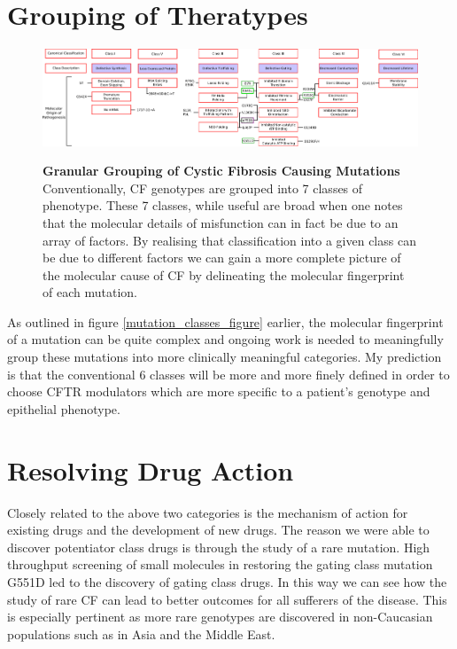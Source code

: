 \section{Grouping of Theratypes}
\begin{landscape}
\begin{figure}
	\begin{center}
	\includegraphics[width=1.5\textwidth]{figures/classes_mutations.pdf}\\
	\end{center}
	\captionsetup{singlelinecheck = false, justification=raggedright}
	\caption[Granular grouping of CF pathogenesis]{\textbf{Granular Grouping of Cystic Fibrosis Causing Mutations}{ Conventionally, CF genotypes are grouped into 7 classes of phenotype. These 7 classes, while useful are broad when one notes that the molecular details of misfunction can in fact be due to an array of factors. By realising that classification into a given class can be due to different factors we can gain a more complete  picture of the molecular cause of CF by delineating the molecular fingerprint of each mutation.}}

\end{figure}
\end{landscape}

As outlined in figure \ref{mutation_classes_figure} earlier, the molecular fingerprint of a mutation can be quite complex and ongoing work is needed to meaningfully group these mutations into more clinically meaningful categories. My prediction is that the conventional 6 classes will be more and more finely defined in order to choose CFTR modulators which are more specific to a patient's genotype and epithelial phenotype. 

\section{Resolving Drug Action}
Closely related to the above two categories is the mechanism of action for existing drugs and the development of new drugs. The reason we were able to discover potentiator class drugs is through the study of a rare mutation. High throughput screening of small molecules in restoring the gating class mutation G551D led to the discovery of gating class drugs. In this way we can see how the study of rare CF can lead to better outcomes for all sufferers of the disease. This is especially pertinent as more rare genotypes are discovered in non-Caucasian populations such as in Asia and the Middle East.  

